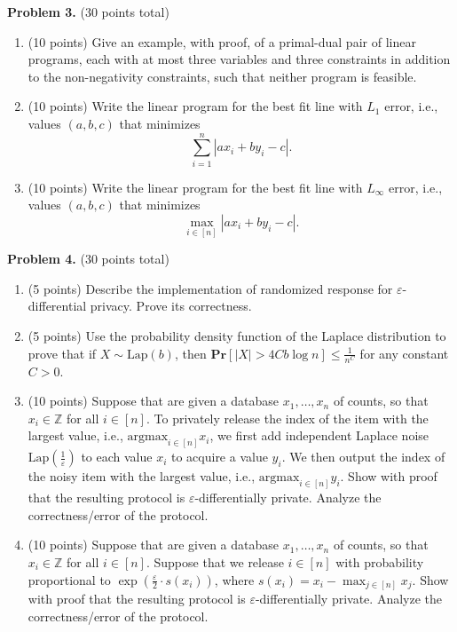 \documentclass[11pt]{article}
\newcommand{\PPr}[1]{\ensuremath{\mathbf{Pr}\left[#1\right]}}
\newcommand{\eps}{\varepsilon}
\begin{document}
\vskip 0.2in\noindent
\textbf{Problem 3.} (30 points total)
\begin{enumerate}
\item (10 points)
Give an example, with proof, of a primal-dual pair of linear programs, each with at most three variables and three constraints in addition to the non-negativity constraints, such that neither program is feasible. 
\item (10 points)
Write the linear program for the best fit line with $L_1$ error, i.e., values $(a,b,c)$ that minimizes 
\[\sum_{i=1}^n|ax_i+by_i-c|.\]
\item (10 points)
Write the linear program for the best fit line with $L_\infty$ error, i.e., values $(a,b,c)$ that minimizes 
\[\max_{i\in[n]}|ax_i+by_i-c|.\] 
\end{enumerate}

\vskip 0.2in\noindent
\textbf{Problem 4.} (30 points total)
\begin{enumerate}
\item (5 points)
Describe the implementation of randomized response for $\eps$-differential privacy. 
Prove its correctness.
\item (5 points)
Use the probability density function of the Laplace distribution to prove that if $X\sim\text{Lap}(b)$, then $\PPr{|X|>4Cb\log n}\le\frac{1}{n^C}$ for any constant $C>0$.  
\item (10 points)
Suppose that are given a database $x_1,\ldots,x_n$ of counts, so that $x_i\in\mathbb{Z}$ for all $i\in[n]$. 
To privately release the index of the item with the largest value, i.e., $\text{argmax}_{i\in[n]} x_i$, we first add independent Laplace noise $\text{Lap}\left(\frac{1}{\eps}\right)$ to each value $x_i$ to acquire a value $y_i$. 
We then output the index of the noisy item with the largest value, i.e., $\text{argmax}_{i\in[n]} y_i$. 
Show with proof that the resulting protocol is $\eps$-differentially private. 
Analyze the correctness/error of the protocol. 
\item (10 points)
Suppose that are given a database $x_1,\ldots,x_n$ of counts, so that $x_i\in\mathbb{Z}$ for all $i\in[n]$. 
Suppose that we release $i\in[n]$ with probability proportional to $\exp\left(\frac{\eps}{2}\cdot s(x_i)\right)$, where $s(x_i)=x_i-\max_{j\in[n]} x_j$. 
Show with proof that the resulting protocol is $\eps$-differentially private. 
Analyze the correctness/error of the protocol. 
\end{enumerate}
\end{document}
